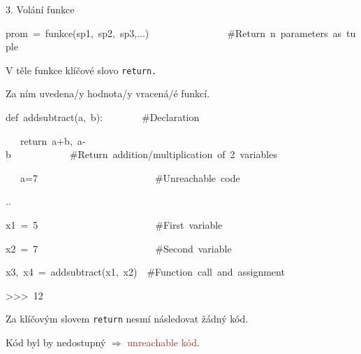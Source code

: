 \documentclass[czech]{beamer}
\newenvironment{lyxcode}
  {\par\begin{list}{}{
    \setlength{\rightmargin}{\leftmargin}
    \setlength{\listparindent}{0pt}%
    \raggedright
    \setlength{\itemsep}{0pt}
    \setlength{\parsep}{0pt}
    \normalfont\ttfamily}%
   \def\{{\char`\{}
   \def\}{\char`\}}
   \def\textasciitilde{\char`\~}
   \item[]}
  {\end{list}}
\begin{document}
\begin{frame}{3. Volání funkce}
\begin{lyxcode}
{\tiny prom~=~funkce(sp1,~sp2,~sp3,...)~~~~~~~~~~~~~~~~\#Return~n~parameters~as~tuple}{\tiny\par}
\end{lyxcode}
{\tiny V těle funkce klíčové slovo }{\tiny\texttt{return.}}{\tiny\par}

{\tiny Za ním uvedena/y hodnota/y vracená/é funkcí. }{\tiny\par}
\begin{lyxcode}
{\tiny def~addsubtract(a,~b):~~~~~~~~\#Declaration}~

{\tiny\par}{\tiny ~~~return~a+b,~a-b~~~~~~~~~~~~\#Return~addition/multiplication~of~2~variables~}{\tiny\par}

{\tiny ~~~a=7~~~~~~~~~~~~~~~~~~~~~~~~\#Unreachable~code}{\tiny\par}

{\tiny ..}{\tiny\par}

{\tiny x1~=~5~~~~~~~~~~~~~~~~~~~~~~~~\#First~variable}{\tiny\par}

{\tiny x2~=~7~~~~~~~~~~~~~~~~~~~~~~~~\#Second~variable}{\tiny\par}

{\tiny x3,~x4~=~addsubtract(x1,~x2)~~\#Function~call~and~assignment}{\tiny\par}

{\tiny >\textcompwordmark >\textcompwordmark >~12}{\tiny\par}
\end{lyxcode}
{\tiny Za klíčovým slovem }{\tiny\texttt{return}}{\tiny{} nesmí následovat
žádný kód. }{\tiny\par}

{\tiny Kód byl by nedostupný}{\tiny\emph{ $\Rightarrow$ }}{\tiny\textcolor{brown}{unreachable
kód}}{\tiny .}{\tiny\par}
\end{frame}
\end{document}
